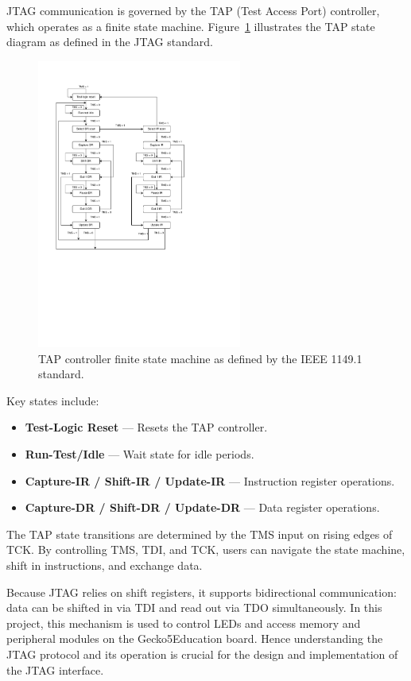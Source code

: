 \documentclass[a4paper,11pt,oneside]{report}
\newcommand{\boardName}{Gecko5Education \xspace}
\begin{document}
JTAG communication is governed by the TAP (Test Access Port) controller,  
which operates as a finite state machine.  
Figure~\ref{fig:tap-fsm} illustrates the TAP state diagram as defined in the JTAG standard.

\begin{figure}[H]
    \centering
    \includegraphics[width=0.6\textwidth]{figures/TAP_FSM.pdf} %
    \caption{TAP controller finite state machine as defined by the IEEE 1149.1 standard.}
    \label{fig:tap-fsm}
\end{figure}

Key states include:  

\begin{itemize}
    \item \textbf{Test-Logic Reset} — Resets the TAP controller.  
    \item \textbf{Run-Test/Idle} — Wait state for idle periods.  
    \item \textbf{Capture-IR / Shift-IR / Update-IR} — Instruction register operations.  
    \item \textbf{Capture-DR / Shift-DR / Update-DR} — Data register operations.  
\end{itemize}

The TAP state transitions are determined by the TMS input on rising edges of TCK.  
By controlling TMS, TDI, and TCK, users can navigate the state machine,  
shift in instructions, and exchange data.  

Because JTAG relies on shift registers, it supports bidirectional communication:  
data can be shifted in via TDI and read out via TDO simultaneously.  
In this project, this mechanism is used to control LEDs  
and access memory and peripheral modules on the \boardName board.  
Hence understanding the JTAG protocol and its operation is crucial for the design and implementation of the JTAG interface.
\end{document}
